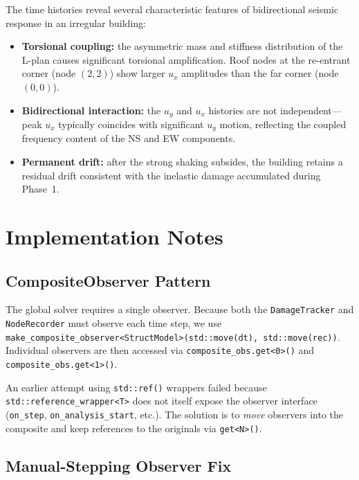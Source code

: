 The time histories reveal several characteristic features of
bidirectional seismic response in an irregular building:

\begin{itemize}
  \item \textbf{Torsional coupling:} the asymmetric mass and stiffness
        distribution of the L-plan causes significant torsional amplification.
        Roof nodes at the re-entrant corner (node $(2,2)$) show larger
        $u_x$ amplitudes than the far corner (node $(0,0)$).
  \item \textbf{Bidirectional interaction:} the $u_y$ and $u_x$ histories
        are not independent---peak $u_x$ typically coincides with significant
        $u_y$ motion, reflecting the coupled frequency content of the
        NS and EW components.
  \item \textbf{Permanent drift:} after the strong shaking subsides,
        the building retains a residual drift consistent with the
        inelastic damage accumulated during Phase~1.
\end{itemize}


\section{Implementation Notes}
\label{sec:lshaped-impl-notes}

\subsection{CompositeObserver Pattern}
\label{sec:lshaped-composite-obs}

The global solver requires a single observer.  Because both the
\texttt{DamageTracker} and \texttt{NodeRecorder} must observe each time step,
we use \texttt{make\_composite\_observer<StructModel>(std::move(dt), std::move(rec))}.
Individual observers are then accessed via \texttt{composite\_obs.get<0>()} and
\texttt{composite\_obs.get<1>()}.

An earlier attempt using \texttt{std::ref()} wrappers failed because
\texttt{std::reference\_wrapper<T>} does not itself expose the observer
interface (\texttt{on\_step}, \texttt{on\_analysis\_start}, etc.).
The solution is to \emph{move} observers into the composite and keep
references to the originals via \texttt{get<N>()}.

\subsection{Manual-Stepping Observer Fix}
\label{sec:lshaped-manual-step-fix}

